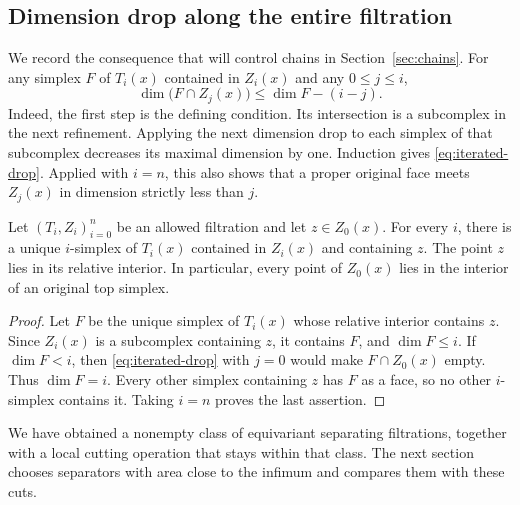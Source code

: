 \subsection{Dimension drop along the entire filtration}

We record the consequence that will control chains in
Section~\ref{sec:chains}.  For any simplex $F$ of $T_i(x)$ contained in
$Z_i(x)$ and any $0\le j\le i$,
\begin{equation}\label{eq:iterated-drop}
 \dim\bigl(F\cap Z_j(x)\bigr)\le\dim F-(i-j).
\end{equation}
Indeed, the first step is the defining condition.  Its intersection is
a subcomplex in the next refinement.  Applying the next dimension
drop to each simplex of that subcomplex decreases its maximal
dimension by one.  Induction gives \eqref{eq:iterated-drop}.
Applied with $i=n$, this also shows that a proper original face meets
$Z_j(x)$ in dimension strictly less than $j$.

\begin{lemma}\label{lem:carrier}
Let $(T_i,Z_i)_{i=0}^n$ be an allowed filtration and let $z\in Z_0(x)$.
For every $i$, there is a unique $i$-simplex of $T_i(x)$ contained in
$Z_i(x)$ and containing $z$.  The point $z$ lies in its relative
interior.  In particular, every point of $Z_0(x)$ lies in the interior
of an original top simplex.
\end{lemma}

\begin{proof}
Let $F$ be the unique simplex of $T_i(x)$ whose relative interior
contains $z$.  Since $Z_i(x)$ is a subcomplex containing $z$, it contains
$F$, and $\dim F\le i$.  If $\dim F<i$, then
\eqref{eq:iterated-drop} with $j=0$ would make $F\cap Z_0(x)$ empty.
Thus $\dim F=i$.  Every other simplex containing $z$ has $F$ as a face,
so no other $i$-simplex contains it.  Taking $i=n$ proves the last
assertion.
\end{proof}

We have obtained a nonempty class of equivariant separating
filtrations, together with a local cutting operation that stays within
that class.  The next section chooses separators with area close to
the infimum and compares them with these cuts.
